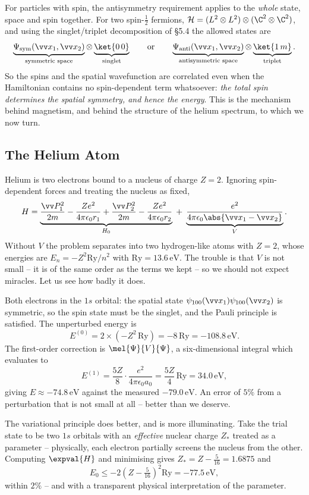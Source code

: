 For particles with spin, the antisymmetry requirement applies to the \emph{whole} state, space and spin together. For two spin-$\frac12$ fermions, $\mathcal{H} = (L^2\otimes L^2)\otimes(\C^2\otimes\C^2)$, and using the singlet/triplet decomposition of \S5.4 the allowed states are
$$
\underbrace{\Psi_{\text{sym}}(\vv x_1, \vv x_2)}_{\text{symmetric space}} \otimes \underbrace{\ket{0\,0}}_{\text{singlet}}
\qquad \text{or} \qquad
\underbrace{\Psi_{\text{anti}}(\vv x_1,\vv x_2)}_{\text{antisymmetric space}} \otimes \underbrace{\ket{1\,m}}_{\text{triplet}}.
$$
So the spins and the spatial wavefunction are correlated even when the Hamiltonian contains no spin-dependent term whatsoever: \emph{the total spin determines the spatial symmetry, and hence the energy}. This is the mechanism behind magnetism, and behind the structure of the helium spectrum, to which we now turn.

\subsection{The Helium Atom}

Helium is two electrons bound to a nucleus of charge $Z = 2$. Ignoring spin-dependent forces and treating the nucleus as fixed,
$$
H = \underbrace{\frac{\vv P_1^2}{2m} - \frac{Ze^2}{4\pi\epsilon_0 r_1} + \frac{\vv P_2^2}{2m} - \frac{Ze^2}{4\pi\epsilon_0 r_2}}_{H_0} \;+\; \underbrace{\frac{e^2}{4\pi\epsilon_0\abs{\vv x_1 - \vv x_2}}}_{V}.
$$
Without $V$ the problem separates into two hydrogen-like atoms with $Z=2$, whose energies are $E_n = -Z^2 \mathrm{Ry}/n^2$ with $\mathrm{Ry} = 13.6\,\mathrm{eV}$. The trouble is that $V$ is not small -- it is of the same order as the terms we kept -- so we should not expect miracles. Let us see how badly it does.

\begin{example}
    Both electrons in the $1s$ orbital: the spatial state $\psi_{100}(\vv x_1)\psi_{100}(\vv x_2)$ is symmetric, so the spin state must be the singlet, and the Pauli principle is satisfied. The unperturbed energy is
    $$
    E^{(0)} = 2\times\left(-Z^2\,\mathrm{Ry}\right) = -8\,\mathrm{Ry} = -108.8\,\mathrm{eV}.
    $$
    The first-order correction is $\mel{\Psi}{V}{\Psi}$, a six-dimensional integral which evaluates to
    $$
    E^{(1)} = \frac{5Z}{8}\cdot\frac{e^2}{4\pi\epsilon_0 a_0} = \frac{5Z}{4}\,\mathrm{Ry} = 34.0\,\mathrm{eV},
    $$
    giving $E \approx -74.8\,\mathrm{eV}$ against the measured $-79.0\,\mathrm{eV}$. An error of $5\%$ from a perturbation that is not small at all -- better than we deserve.

    The variational principle does better, and is more illuminating. Take the trial state to be two $1s$ orbitals with an \emph{effective} nuclear charge $Z_*$ treated as a parameter -- physically, each electron partially screens the nucleus from the other. Computing $\expval{H}$ and minimising gives $Z_* = Z - \frac{5}{16} = 1.6875$ and
    $$
    E_0 \leq -2\left(Z - \tfrac{5}{16}\right)^2 \mathrm{Ry} = -77.5\,\mathrm{eV},
    $$
    within $2\%$ -- and with a transparent physical interpretation of the parameter.
\end{example}

